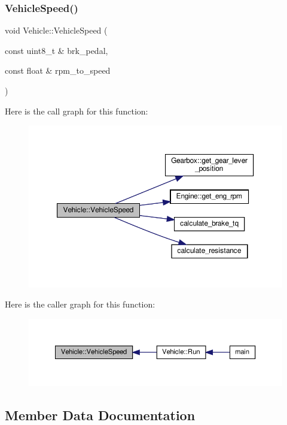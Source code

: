 \subsubsection{\texorpdfstring{Vehicle\+Speed()}{VehicleSpeed()}}
{\footnotesize\ttfamily void Vehicle\+::\+Vehicle\+Speed (\begin{DoxyParamCaption}\item[{const uint8\+\_\+t \&}]{brk\+\_\+pedal,  }\item[{const float \&}]{rpm\+\_\+to\+\_\+speed }\end{DoxyParamCaption})}

Here is the call graph for this function\+:
\nopagebreak
\begin{figure}[H]
\begin{center}
\leavevmode
\includegraphics[width=350pt]{classVehicle_a0967229be7b0b40b3f84c86942e43a52_cgraph}
\end{center}
\end{figure}
Here is the caller graph for this function\+:
\nopagebreak
\begin{figure}[H]
\begin{center}
\leavevmode
\includegraphics[width=350pt]{classVehicle_a0967229be7b0b40b3f84c86942e43a52_icgraph}
\end{center}
\end{figure}


\subsection{Member Data Documentation}
\mbox{\label{classVehicle_ac24546ecc3efb25ea01e8d0e322c2785}} 
